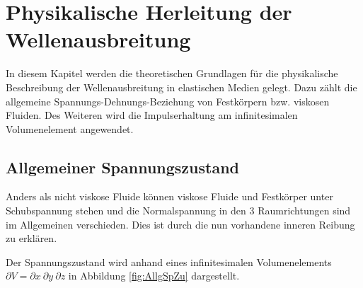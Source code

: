 \documentclass[pdftex,a4paper,parskip,listof=totoc,bibliography=totoc,onehalfspacing,12pt]{scrreprt}
\begin{document}
\setcounter{page}{1}

\cleardoublepage
\chapter{Physikalische Herleitung der Wellenausbreitung}

In diesem Kapitel werden die theoretischen Grundlagen für die physikalische Beschreibung der Wellenausbreitung in elastischen Medien gelegt. Dazu zählt die allgemeine Spannungs-Dehnungs-Beziehung von Festkörpern bzw. viskosen Fluiden. Des Weiteren wird die Impulserhaltung am infinitesimalen Volumenelement angewendet.

\section{Allgemeiner Spannungszustand}
\label{kap:AllSp}
Anders als nicht viskose Fluide können viskose Fluide und Festkörper unter Schubspannung stehen und die Normalspannung in den 3 Raumrichtungen sind im Allgemeinen verschieden. Dies ist durch die nun vorhandene inneren Reibung zu erklären.

Der Spannungszustand wird anhand eines infinitesimalen Volumenelements $\partial V = \partial x~ \partial y~ \partial z$ in Abbildung \ref{fig:AllgSpZu} dargestellt.
\end{document}
